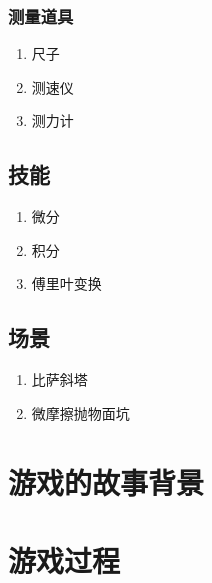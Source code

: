 \documentclass{tstextbook}
\begin{document}
\subsection{测量道具}

\begin{enumerate}

\item{尺子}

\item{测速仪}

\item{测力计}

\end{enumerate}

\section{技能}

\begin{enumerate}

\item{微分}

\item{积分}

\item{傅里叶变换}

\end{enumerate}

\section{场景}

\begin{enumerate}

\item{比萨斜塔}

\item{微摩擦抛物面坑}

\end{enumerate}

\chapter{游戏的故事背景}

\begin{summary}

\end{summary}

\chapter{游戏过程}
\end{document}
